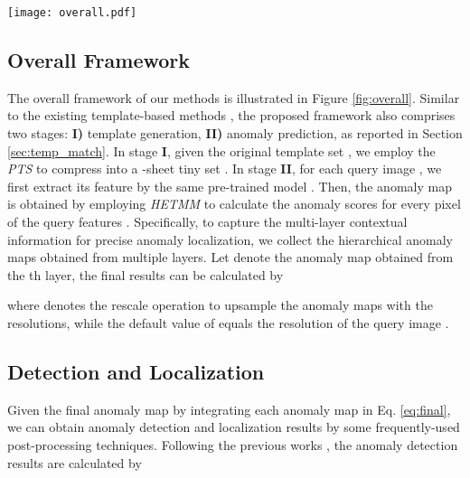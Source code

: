 \documentclass[default,iicol]{sn-jnl}\usepackage[algo2e,ruled,linesnumbered]{algorithm2e}
\theoremstyle{thmstyleone}\newtheorem{theorem}{Theorem}\newtheorem{proposition}[theorem]{Proposition}
\theoremstyle{thmstyletwo}\newtheorem{example}{Example}\newtheorem{remark}{Remark}
\theoremstyle{thmstylethree}\newtheorem{definition}{Definition}
\begin{document}
\begin{figure*}[!t]
    \centering
    \texttt{[image: overall.pdf]}
    \caption{The overall framework of our methods.
    In stage \textbf{I}, the original template set  is the aggregation of the features extracted from the collected  nominal-only images  by a pre-trained backbone .
    To streamline  into a tiny set  with  sheets (), \textit{PTS} selects  significant prototypes from  in each pixel coordinate.
    In stage \textbf{II}, given a query image , we first extract its feature  by the same pre-trained backbone  and then employ \textit{HETMM} to obtain the corresponding anomaly map.
    }
    \label{fig:overall}
\end{figure*}

\subsection{Overall Framework}
The overall framework of our methods is illustrated in Figure \ref{fig:overall}.
Similar to the existing template-based methods \cite{SPADE,patchcore}, the proposed framework also comprises two stages: \textbf{I)} template generation, \textbf{II)} anomaly prediction, as reported in Section \ref{sec:temp_match}.
In stage \textbf{I}, given the original template set , we employ the \textit{PTS} to compress  into a -sheet tiny set .
In stage \textbf{II}, for each query image , we first extract its feature  by the same pre-trained model .
Then, the anomaly map is obtained by employing \textit{HETMM} to calculate the anomaly scores for every pixel of the query features .
Specifically, to capture the multi-layer contextual information for precise anomaly localization, we collect the hierarchical anomaly maps  obtained from multiple layers.
Let  denote the anomaly map obtained from the th layer, the final results  can be calculated by

where  denotes the rescale operation to upsample the anomaly maps with the  resolutions, while the default value of  equals the resolution of the query image .


\subsection{Detection and Localization}
Given the final anomaly map  by integrating each anomaly map  in Eq. \ref{eq:final}, we can obtain anomaly detection and localization results by some frequently-used post-processing techniques.
Following the previous works \cite{patchcore,SPADE,Padim}, the anomaly detection results  are calculated by
\end{document}
